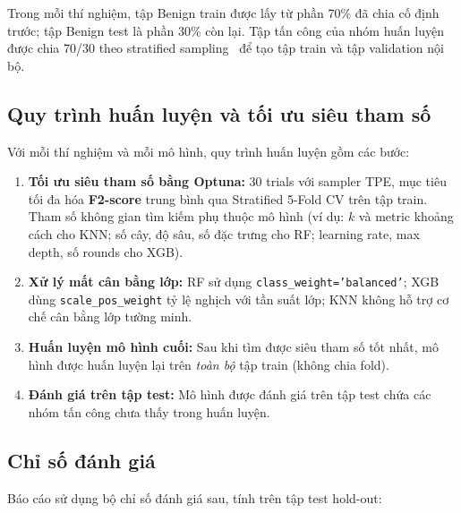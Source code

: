 Trong mỗi thí nghiệm, tập Benign train được lấy từ phần 70\% đã chia cố định trước; tập Benign test là phần 30\% còn lại. Tập tấn công của nhóm huấn luyện được chia 70/30 theo stratified sampling~\cite{pedregosa2011scikit} để tạo tập train và tập validation nội bộ.

\subsection{Quy trình huấn luyện và tối ưu siêu tham số}

Với mỗi thí nghiệm và mỗi mô hình, quy trình huấn luyện gồm các bước:

\begin{enumerate}
    \item \textbf{Tối ưu siêu tham số bằng Optuna:} 30 trials với sampler TPE, mục tiêu tối đa hóa \textbf{F2-score} trung bình qua Stratified 5-Fold CV trên tập train. Tham số không gian tìm kiếm phụ thuộc mô hình (ví dụ: $k$ và metric khoảng cách cho KNN; số cây, độ sâu, số đặc trưng cho RF; learning rate, max depth, số rounds cho XGB).

    \item \textbf{Xử lý mất cân bằng lớp:} RF sử dụng \texttt{class\_weight='balanced'}; XGB dùng \texttt{scale\_pos\_weight} tỷ lệ nghịch với tần suất lớp; KNN không hỗ trợ cơ chế cân bằng lớp tường minh.

    \item \textbf{Huấn luyện mô hình cuối:} Sau khi tìm được siêu tham số tốt nhất, mô hình được huấn luyện lại trên \textit{toàn bộ} tập train (không chia fold).

    \item \textbf{Đánh giá trên tập test:} Mô hình được đánh giá trên tập test chứa các nhóm tấn công chưa thấy trong huấn luyện.
\end{enumerate}

\subsection{Chỉ số đánh giá}

Báo cáo sử dụng bộ chỉ số đánh giá sau, tính trên tập test hold-out:

